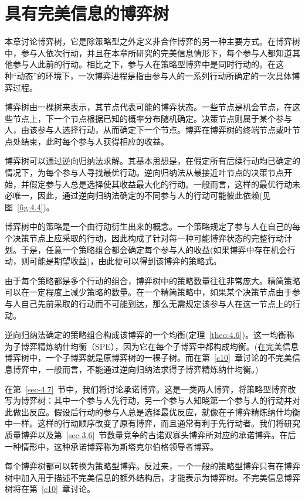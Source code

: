 \chapter{具有完美信息的博弈树}\label{c4}

本章讨论博弈树，它是除策略型之外定义非合作博弈的另一种主要方式。在博弈树中，参与人依次行动，并且在本章所研究的完美信息情形下，每个参与人都知道其他参与人此前的行动。相比之下，参与人在策略型博弈中是同时行动的。在这种“动态”的环境下，一次博弈进程是指由参与人的一系列行动所确定的一次具体博弈过程。

博弈树由一棵树来表示，其节点代表可能的博弈状态。一些节点是机会节点，在这些节点上，下一个节点根据已知的概率分布随机确定。决策节点则属于某个参与人，由该参与人选择行动，从而确定下一个节点。博弈在博弈树的终端节点或叶节点处结束，此时每个参与人获得相应的收益。

博弈树可以通过逆向归纳法求解。其基本思想是，在假定所有后续行动均已确定的情况下，为每个参与人寻找最优行动。逆向归纳法从最接近叶节点的决策节点开始，并假定参与人总是选择使其收益最大化的行动。一般而言，这样的最优行动未必唯一，因此，通过逆向归纳法确定的不同参与人的行动可能彼此依赖(见图~\ref{fig:4.4})。

博弈树中的策略是一个由行动衍生出来的概念。一个策略规定了参与人在自己的每个决策节点上应采取的行动，因此构成了针对每一种可能博弈状态的完整行动计划。于是，任意一个策略组合都会确定每个参与人的收益(如果博弈中存在机会行动，则可能是期望收益)，由此便可以得到该博弈的策略式。

由于每个策略都是多个行动的组合，博弈树中的策略数量往往非常庞大。精简策略可以在一定程度上减少策略的数量。在一个精简策略中，如果某个决策节点由于参与人自己先前采取的行动而不可能到达，那么无需规定该参与人在这一节点上的行动。

逆向归纳法确定的策略组合构成该博弈的一个均衡(定理~\ref{theo:4.6})。这一均衡称为子博弈精炼纳什均衡（SPE），因为它在每个子博弈中都构成均衡。(在完美信息博弈树中，一个子博弈就是原博弈树的一棵子树。而在第~\ref{c10}~章讨论的不完美信息博弈中，一般而言，不能通过逆向归纳法求得子博弈精炼纳什均衡。)

在第~\ref{sec-4.7}~节中，我们将讨论承诺博弈。这是一类两人博弈，将策略型博弈改写为博弈树：其中一个参与人先行动，另一个参与人知晓第一个参与人的行动并对此做出反应。假设后行动的参与人总是选择最优反应，就像在子博弈精炼纳什均衡中一样。这样的行动顺序改变了原有博弈，而且通常有利于先行动者。我们将研究质量博弈以及第~\ref{sec-3.6}~节数量竞争的古诺双寡头博弈所对应的承诺博弈。在后一种情形中，这种承诺博弈称为斯塔克尔伯格领导者博弈。

每个博弈树都可以转换为策略型博弈。反过来，一个一般的策略型博弈只有在博弈树中加入用于描述不完美信息的额外结构后，才能表示为博弈树。不完美信息博弈树将在第~\ref{c10}~章讨论。

